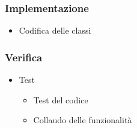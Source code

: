 \documentclass[../piano-di-progetto.tex]{subfiles}
\begin{document}
\subsubsection{Implementazione}%
\label{subs:implementazione}
\begin{itemize}
  \item Codifica delle classi
\end{itemize}
\subsubsection{Verifica}%
\label{subs:verifica}
\begin{itemize}
  \item Test
  \begin{itemize}
    \item Test del codice
    \item Collaudo delle funzionalità
  \end{itemize}
\end{itemize}
\end{document}

